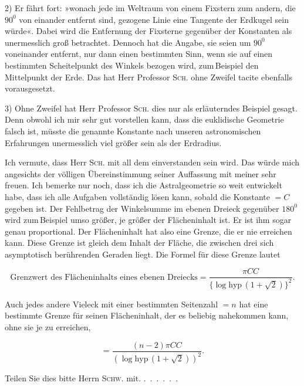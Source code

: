 2) Er fährt fort: »wonach jede im Weltraum von einem Fixstern zum andern, die $90^{0}$ von einander entfernt sind, gezogene Linie eine Tangente der Erdkugel sein würde«. Dabei wird die Entfernung der Fixsterne gegenüber der Konstanten als unermesslich groß betrachtet. Dennoch hat die Angabe, sie seien um $90^{0}$ voneinander entfernt, nur dann einen bestimmten Sinn, wenn sie auf einen bestimmten Scheitelpunkt des Winkels bezogen wird, zum\,Beispiel den Mittelpunkt der Erde. Das hat Herr Professor \textsc{Sch.} ohne Zweifel tacite ebenfalls vorausgesetzt.

3) Ohne Zweifel hat Herr Professor \textsc{Sch.} dies nur als erläuterndes Beispiel gesagt. Denn obwohl ich mir sehr gut vorstellen kann, dass die euklidische Geometrie falsch ist, müsste die genannte Konstante nach unseren astronomischen Erfahrungen unermesslich viel größer sein als der Erdradius.

Ich vermute, dass Herr \textsc{Sch.} mit all dem einverstanden sein wird. Das würde mich angesichts der völligen Übereinstimmung seiner Auffassung mit meiner sehr freuen. Ich bemerke nur noch, dass ich die Astralgeometrie so weit entwickelt habe, dass ich alle Aufgaben vollständig lösen kann, sobald die Konstante $= C$ gegeben ist. Der Fehlbetrag der Winkelsumme im ebenen Dreieck gegenüber $180^{0}$ wird zum\,Beispiel umso größer, je größer der Flächeninhalt ist. Er ist ihm sogar genau proportional. Der Flächeninhalt hat also eine Grenze, die er nie erreichen kann. Diese Grenze ist gleich dem Inhalt der Fläche, die zwischen drei sich asymptotisch berührenden Geraden liegt. Die Formel für diese Grenze lautet
\begin{center}\end{center}
\[
\text{Grenzwert des Flächeninhalts eines ebenen Dreiecks} = \frac{\pi CC}{\{\log\mathrm{hyp}\,(1+\sqrt{2})\}^{2}}.
\]



Auch jedes andere Vieleck mit einer bestimmten Seitenzahl $= n$ hat eine bestimmte Grenze für seinen Flächeninhalt, der es beliebig nahekommen kann, ohne sie je zu erreichen,

\[
= \frac{(n-2)\pi CC}{(\log\mathrm{hyp}\,(1+\sqrt{2}))^{2}}.
\]

Teilen Sie dies bitte Herrn \textsc{Schw.} mit. .\ .\ .\ .\ .\ .

\bigskip
\noindent\hrulefill

